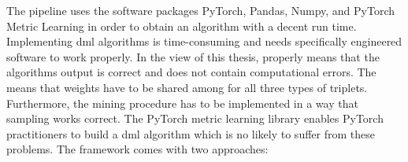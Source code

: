\begin{table}[]
	\centering
	\caption{Hyperparameters for training and validating \ac{dml} models.}
	\label{tab:hypers}
\end{table}
The pipeline uses the software packages PyTorch, Pandas, Numpy, and PyTorch Metric Learning in order to obtain an algorithm with a decent run time. Implementing \ac{dml} algorithms is time-consuming and needs specifically engineered software to work properly. In the view of this thesis, properly means that the algorithms output is correct and does not contain computational errors. The means that weights have to be shared among for all three types of triplets. Furthermore, the mining procedure has to be implemented in a way that sampling works correct. The PyTorch metric learning library enables PyTorch practitioners to build a \ac{dml} algorithm which is no likely to suffer from these problems. The framework comes with two approaches:
